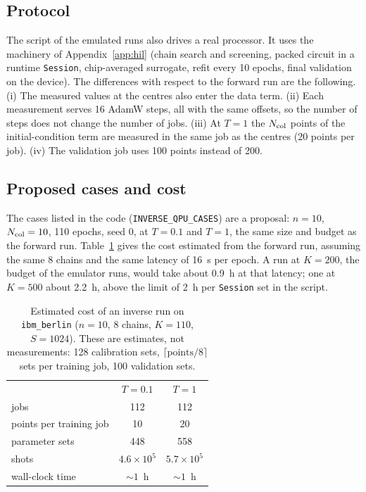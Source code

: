 \documentclass[floatfix,aps,pra,twocolumn,superscriptaddress,10pt,nofootinbib]{revtex4-2}
\newcommand{\Ncol}{N_{\rm col}}
\begin{document}
\begin{appendices}
\subsection{Protocol}\label{app:iprot}
The script of the emulated runs also drives a real processor. It uses the machinery of Appendix~\ref{app:hil} (chain search and screening, packed circuit in a runtime \texttt{Session}, chip-averaged surrogate, refit every 10 epochs, final validation on the device). The differences with respect to the forward run are the following. (i) The measured values at the centres also enter the data term. (ii) Each measurement serves 16 AdamW steps, all with the same offsets, so the number of steps does not change the number of jobs. (iii) At $T=1$ the $\Ncol$ points of the initial-condition term are measured in the same job as the centres (20 points per job). (iv) The validation job uses 100 points instead of 200.

\subsection{Proposed cases and cost}\label{app:icost}
The cases listed in the code (\texttt{INVERSE\_QPU\_CASES}) are a proposal: $n=10$, $\Ncol=10$, 110 epochs, seed 0, at $T=0.1$ and $T=1$, the same size and budget as the forward run. Table~\ref{tab:icost} gives the cost estimated from the forward run, assuming the same 8 chains and the same latency of 16~s per epoch. A run at $K=200$, the budget of the emulator runs, would take about 0.9~h at that latency; one at $K=500$ about 2.2~h, above the limit of 2~h per \texttt{Session} set in the script.

\begin{table}[h]
\caption{\justifying Estimated cost of an inverse run on \texttt{ibm\_berlin} ($n=10$, 8 chains, $K=110$, $S=1024$). These are estimates, not measurements: 128 calibration sets, $\lceil\text{points}/8\rceil$ sets per training job, 100 validation sets.}
\label{tab:icost}
\setlength{\tabcolsep}{4pt}
\footnotesize
\begin{ruledtabular}
\begin{tabular}{lcc}
 & $T=0.1$ & $T=1$\\
\colrule
jobs & 112 & 112\\
points per training job & 10 & 20\\
parameter sets & 448 & 558\\
shots & $4.6\times10^5$ & $5.7\times10^5$\\
wall-clock time & $\sim1$~h & $\sim1$~h\\
\end{tabular}
\end{ruledtabular}
\end{table}


\end{appendices}
\end{document}
